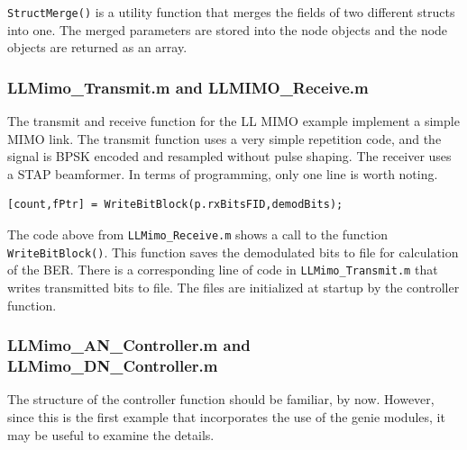 \verb+StructMerge()+ is a utility function that merges the fields of
two different structs into one.  The merged parameters are stored
into the node objects and the node objects are returned as an array.

\subsubsection{LLMimo\_Transmit.m and LLMIMO\_Receive.m}

The transmit and receive function for the LL MIMO example implement
a simple MIMO link.  The transmit function uses a very simple
repetition code, and the signal is BPSK encoded and resampled
without pulse shaping.  The receiver uses a STAP beamformer. In
terms of programming, only one line is worth noting.

\begin{lstlisting}[name=llmimoReceive,firstnumber=71]
% Save received bits to file for comparison with received bits
[count,fPtr] = WriteBitBlock(p.rxBitsFID,demodBits);
\end{lstlisting}

The code above from \verb+LLMimo_Receive.m+ shows a call to the
function \verb+WriteBitBlock()+.  This function saves the
demodulated bits to file for calculation of the BER.  There is a
corresponding line of code in \verb+LLMimo_Transmit.m+ that writes
transmitted bits to file.  The files are initialized at startup by
the controller function.

\subsubsection{LLMimo\_AN\_Controller.m and LLMimo\_DN\_Controller.m}

The structure of the controller function should be familiar, by now.
However, since this is the first example that incorporates the use
of the genie modules, it may be useful to examine the details.

